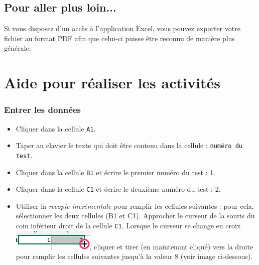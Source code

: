 \subsection{Pour aller plus loin...}

Si vous disposez d'un accès à l'application Excel, vous pouvez exporter votre fichier au format PDF afin que celui-ci puisse être reconnu de manière plus générale.



%
%
%
%

\newpage

\section{Aide pour réaliser les activités}\label{aideExcel}

\subsubsection{Entrer les données}

\begin{itemize}
\item Cliquer dans la cellule \texttt{A1}.
\item Taper au clavier le texte qui doit être contenu dans la cellule : \texttt{numéro du test}.
\item Cliquer dans la cellule \texttt{B1} et écrire le premier numéro du test : 1.
\item Cliquer dans la cellule \texttt{C1} et écrire le deuxième numéro du test : 2.
\item Utiliser la \emph{recopie incrémentale} pour remplir les cellules suivantes : pour cela, sélectionner les deux cellules (B1 et C1). Approcher le curseur de la souris du coin inférieur droit de la cellule \texttt{C1}. Lorsque le curseur se change en croix
\includegraphics[scale=.4]{./images/tableur/recopieIncrementale_Excel_crop}, cliquer et tirer (en maintenant cliqué) vers la droite pour remplir les cellules suivantes jusqu'à la valeur 8 (voir image ci-dessous).
\end{itemize}


